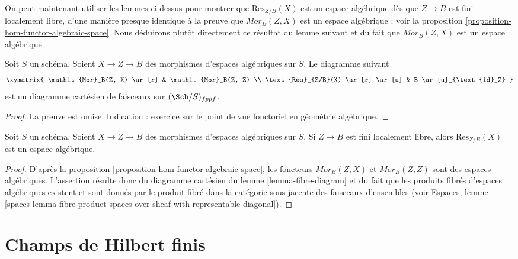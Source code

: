 \noindent
On peut maintenant utiliser les lemmes ci-dessus pour montrer que $\text{Res}_{Z/B}(X)$
est un espace algébrique dès que $Z \to B$ est fini localement libre, d'une manière
presque identique à la preuve que $\mathit{Mor}_B(Z, X)$ est un
espace algébrique ; voir la
proposition \ref{proposition-hom-functor-algebraic-space}.
Nous déduirons plutôt directement ce résultat du lemme suivant
et du fait que $\mathit{Mor}_B(Z, X)$ est un espace algébrique.

\begin{lemma}
\label{lemma-fibre-diagram}
Soit $S$ un schéma. Soient $X \to Z \to B$ des morphismes
d'espaces algébriques sur $S$. Le diagramme suivant
$$
\xymatrix{
\mathit{Mor}_B(Z, X) \ar[r] & \mathit{Mor}_B(Z, Z) \\
\text{Res}_{Z/B}(X) \ar[r] \ar[u] & B \ar[u]_{\text{id}_Z}
}
$$
est un diagramme cartésien de faisceaux sur $(\Sch/S)_{fppf}$.
\end{lemma}

\begin{proof}
La preuve est omise. Indication : exercice sur le point de vue fonctoriel en
géométrie algébrique.
\end{proof}

\begin{proposition}
\label{proposition-restriction-of-scalars-algebraic-space}
Soit $S$ un schéma. Soient $X \to Z \to B$ des morphismes
d'espaces algébriques sur $S$. Si $Z \to B$ est fini localement libre,
alors $\text{Res}_{Z/B}(X)$ est un espace algébrique.
\end{proposition}

\begin{proof}
D'après la
proposition \ref{proposition-hom-functor-algebraic-space},
les foncteurs $\mathit{Mor}_B(Z, X)$ et $\mathit{Mor}_B(Z, Z)$
sont des espaces algébriques. L'assertion résulte donc du diagramme cartésien
du
lemme \ref{lemma-fibre-diagram}
et du fait que les produits fibrés d'espaces algébriques existent et
sont donnés par le produit fibré dans la catégorie sous-jacente des
faisceaux d'ensembles (voir
Espaces, lemme
\ref{spaces-lemma-fibre-product-spaces-over-sheaf-with-representable-diagonal}).
\end{proof}






\section{Champs de Hilbert finis}
\label{section-finite-hilbert-stacks}


